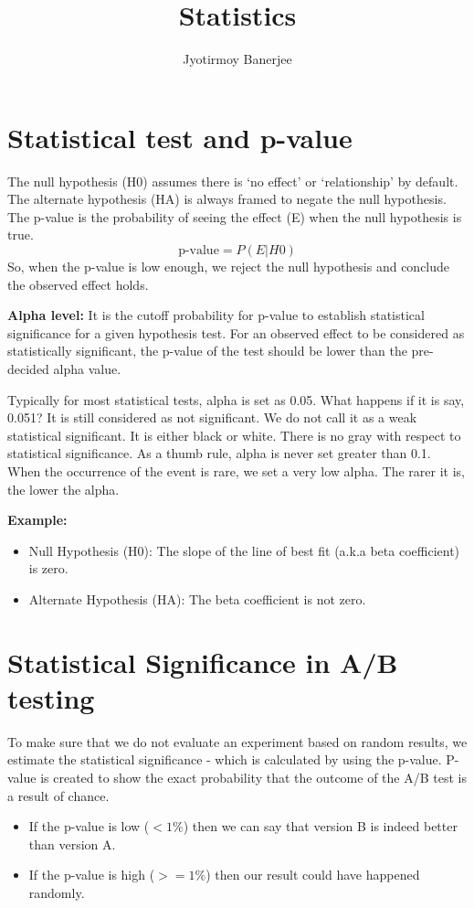 \documentclass{article}
\title{Statistics}
\author{Jyotirmoy Banerjee}
\begin{document}
\maketitle

\section{Statistical test and p-value}
The null hypothesis (H0) assumes there is `no effect' or `relationship' by default. The alternate hypothesis (HA) is always framed to negate the null hypothesis. The p-value is the probability of seeing the effect (E) when the null hypothesis is true.
\[
\text{p-value} = P(E|H0)
\]
So, when the p-value is low enough, we reject the null hypothesis and conclude the observed effect holds.

\textbf{Alpha level:}
It is the cutoff probability for p-value to establish statistical significance for a given hypothesis test.
For an observed effect to be considered as statistically significant, the p-value of the test should be lower than the pre-decided alpha value.

Typically for most statistical tests, alpha is set as 0.05. 
What happens if it is say, 0.051? It is still considered as not significant. We do not call it as a weak statistical significant. It is either black or white. There is no gray with respect to statistical significance.
As a thumb rule, alpha is never set greater than 0.1. When the occurrence of the event is rare, we set a very low alpha. The rarer it is, the lower the alpha.

\textbf{Example:}
\vspace{-\topsep}
\begin{itemize}
\itemsep0em
\item Null Hypothesis (H0): The slope of the line of best fit (a.k.a beta coefficient) is zero.
\item Alternate Hypothesis (HA): The beta coefficient is not zero.
\end{itemize}
\vspace{-\topsep}

\section{Statistical Significance in A/B testing}
To make sure that we do not evaluate an experiment based on random results, we estimate the statistical significance - which is calculated by using the p-value.
P-value is created to show the exact probability that the outcome of the A/B test is a result of chance.
\vspace{-\topsep}
\begin{itemize} 
\itemsep0em
\item If the p-value is low ($<1\%$) then we can say that version B is indeed better than version A.
\item If the p-value is high ($>=1\%$) then our result could have happened randomly.
\end{itemize}
\vspace{-\topsep}
\end{document}
